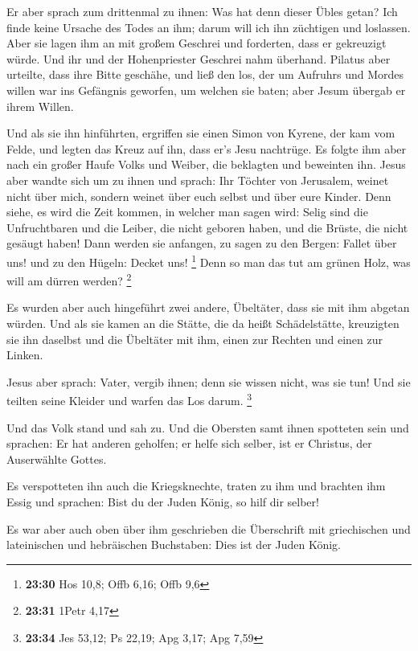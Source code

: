  Er aber sprach zum drittenmal zu ihnen: Was hat denn
dieser Übles getan? Ich finde keine Ursache des Todes an ihm; darum will
ich ihn züchtigen und loslassen.  Aber sie lagen ihm an mit
großem Geschrei und forderten, dass er gekreuzigt würde. Und ihr und der
Hohenpriester Geschrei nahm überhand.  Pilatus aber
urteilte, dass ihre Bitte geschähe,  und ließ den los, der
um Aufruhrs und Mordes willen war ins Gefängnis geworfen, um welchen sie
baten; aber Jesum übergab er ihrem Willen.

 Und als sie ihn hinführten, ergriffen sie einen Simon von
Kyrene, der kam vom Felde, und legten das Kreuz auf ihn, dass er's Jesu
nachtrüge.  Es folgte ihm aber nach ein großer Haufe Volks
und Weiber, die beklagten und beweinten ihn.  Jesus aber
wandte sich um zu ihnen und sprach: Ihr Töchter von Jerusalem, weinet
nicht über mich, sondern weinet über euch selbst und über eure Kinder.
 Denn siehe, es wird die Zeit kommen, in welcher man sagen
wird: Selig sind die Unfruchtbaren und die Leiber, die nicht geboren
haben, und die Brüste, die nicht gesäugt haben!  Dann
werden sie anfangen, zu sagen zu den Bergen: Fallet über uns! und zu den
Hügeln: Decket uns! \footnote{\textbf{23:30} Hos 10,8; Offb 6,16; Offb
  9,6}  Denn so man das tut am grünen Holz, was will am
dürren werden? \footnote{\textbf{23:31} 1Petr 4,17}

 Es wurden aber auch hingeführt zwei andere, Übeltäter,
dass sie mit ihm abgetan würden.  Und als sie kamen an die
Stätte, die da heißt Schädelstätte, kreuzigten sie ihn daselbst und die
Übeltäter mit ihm, einen zur Rechten und einen zur Linken.

 Jesus aber sprach: Vater, vergib ihnen; denn sie wissen
nicht, was sie tun! Und sie teilten seine Kleider und warfen das Los
darum. \footnote{\textbf{23:34} Jes 53,12; Ps 22,19; Apg 3,17; Apg 7,59}

 Und das Volk stand und sah zu. Und die Obersten samt ihnen
spotteten sein und sprachen: Er hat anderen geholfen; er helfe sich
selber, ist er Christus, der Auserwählte Gottes.

 Es verspotteten ihn auch die Kriegsknechte, traten zu ihm
und brachten ihm Essig  und sprachen: Bist du der Juden
König, so hilf dir selber!

 Es war aber auch oben über ihm geschrieben die Überschrift
mit griechischen und lateinischen und hebräischen Buchstaben: Dies ist
der Juden König.

